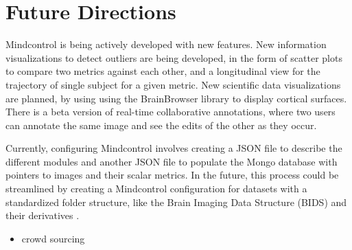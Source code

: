 \section{Future Directions}

Mindcontrol is being actively developed with new features. New information visualizations to detect outliers are being developed, in the form of scatter plots to compare two metrics against each other, and a longitudinal view for the trajectory of single subject for a given metric. New scientific data visualizations are planned, by using using the BrainBrowser library \cite{Sherif_2015} to display cortical surfaces. There is a beta version of real-time collaborative annotations, where two users can annotate the same image and see the edits of the other as they occur. 

Currently, configuring Mindcontrol involves creating a JSON file to describe the different modules and another JSON file to populate the Mongo database with pointers to images and their scalar metrics. In the future, this process could be streamlined by creating a Mindcontrol configuration for datasets with a standardized folder structure, like the Brain Imaging Data Structure (BIDS) \cite{Gorgolewski_2016} and their derivatives \cite{gorgolewski2016bids}. 

\begin{itemize}

\item crowd sourcing

\end{itemize}